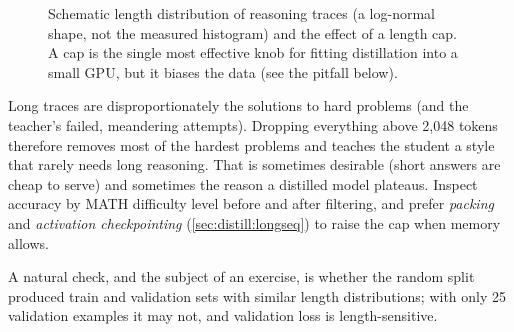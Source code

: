 \begin{figure}[t]
\centering
{}
\caption{Schematic length distribution of reasoning traces (a log-normal shape, not the
measured histogram) and the effect of a length cap. A cap is the single most effective knob
for fitting distillation into a small GPU, but it biases the data (see the pitfall below).}
\label{fig:distill:lengths}
\end{figure}

\begin{pitfall}
Long traces are disproportionately the solutions to hard problems (and the teacher's failed,
meandering attempts). Dropping everything above 2{,}048 tokens therefore removes most of the
hardest problems and teaches the student a style that rarely needs long reasoning. That is
sometimes desirable (short answers are cheap to serve) and sometimes the reason a distilled
model plateaus. Inspect accuracy by MATH difficulty level before and after filtering, and
prefer \emph{packing} and \emph{activation checkpointing} (\cref{sec:distill:longseq}) to
raise the cap when memory allows.
\end{pitfall}

A natural check, and the subject of an exercise, is whether the random split produced train and
validation sets with similar length distributions; with only 25 validation examples it may not,
and validation loss is length-sensitive.

